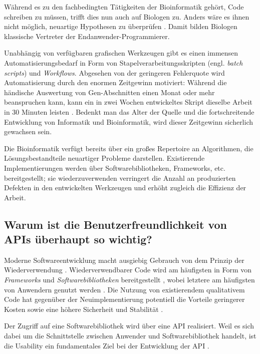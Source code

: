 Während es zu den fachbedingten Tätigkeiten der Bioinformatik gehört, Code schreiben zu müssen, trifft dies nun auch auf Biologen zu. Anders wäre es ihnen nicht möglich, neuartige Hypothesen zu überprüfen \citep{Letondal:2006dy,Tisdall:2001td}. Damit bilden Biologen klassische Vertreter der Endanwender-Programmierer.

Unabhängig von verfügbaren grafischen Werkzeugen gibt es einen immensen Automatisierungsbedarf in Form von Stapelverarbeitungsskripten (engl. \textit{batch scripts}) und \textit{Workflows}. Abgesehen von der geringeren Fehlerquote wird Automatisierung durch den enormen Zeitgewinn motiviert: Während die händische Auswertung von Gen-Abschnitten einen Monat oder mehr beanspruchen kann, kann ein in zwei Wochen entwickeltes Skript dieselbe Arbeit in 30 Minuten leisten \citep{Tisdall:2001td}. Bedenkt man das Alter der Quelle und die fortschreitende Entwicklung von Informatik und Bioinformatik, wird dieser Zeitgewinn sicherlich gewachsen sein.

Die Bioinformatik verfügt bereits über ein großes Repertoire an Algorithmen, die Lösungsbestandteile neuartiger Probleme darstellen. Existierende Implementierungen werden über Softwarebibliotheken, Frameworks, etc. bereitgestellt; sie wiederzuverwenden verringert die Anzahl an produzierten Defekten in den entwickelten Werkzeugen und erhöht zugleich die Effizienz der Arbeit.





\subsection[Relevanz von API-Usability]{Warum ist die Benutzerfreundlichkeit von APIs überhaupt so wichtig?}

Moderne Softwareentwicklung macht ausgiebig Gebrauch von dem Prinzip der Wiederverwendung \citep{Piccioni:2013uq}. Wiederverwendbarer Code wird am häufigsten in Form von \textit{Frameworks} und \textit{Softwarebibliotheken} bereitgestellt \citep{Henning:2007kg,Jeong:kf}, wobei letztere am häufigsten von Anwendern genutzt werden \citep{Feilkas:dg}. Die Nutzung von existierendem qualitativem Code hat gegenüber der Neuimplementierung potentiell die Vorteile geringerer Kosten sowie eine höhere Sicherheit und Stabilität \citep{Stylos:2009ts}.

Der Zugriff auf eine Softwarebibliothek wird über eine API realisiert. Weil es sich dabei um die Schnittstelle zwischen Anwender und Softwarebibliothek handelt, ist die Usability ein fundamentales Ziel bei der Entwicklung der API \citep{Piccioni:2013uq}.

